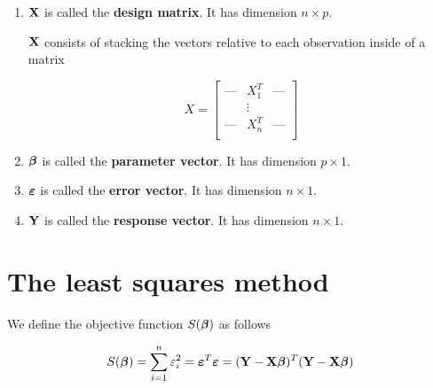 \begin{definition}
    \begin{enumerate}[label=(\alph*)]
        \item $\mathbf{X}$ is called the \textbf{design matrix}. It has dimension $n \times p$.

              $\mathbf{X}$ consists of stacking the vectors relative to each observation inside of a matrix

              \[
                  X =
                  \begin{bmatrix}
                      \text{---} & X_1^T  & \text{---} \\
                                 & \vdots &            \\
                      \text{---} & X_n^T  & \text{---} \\
                  \end{bmatrix}
              \]
        \item $\boldsymbol{\beta}$ is called the \textbf{parameter vector}. It has dimension $p \times 1$.
        \item $\boldsymbol{\varepsilon}$ is called the \textbf{error vector}. It has dimension $n \times 1$.
        \item $\mathbf{Y}$ is called the \textbf{response vector}. It has dimension $n \times 1$.
    \end{enumerate}
\end{definition}





\section{The least squares method}

We define the objective function \( S(\boldsymbol{\beta}) \) as follows

\begin{equation}
    \label{eqn: least squares objective function}
    S(\boldsymbol{\beta}) = \sum_{i=1}^{n} \varepsilon_{i}^{2} = \boldsymbol{\varepsilon}^{T} \boldsymbol{\varepsilon} = (\mathbf{Y}-\mathbf{X} \boldsymbol{\beta})^{T}(\mathbf{Y}-\mathbf{X} \boldsymbol{\beta})
\end{equation}

